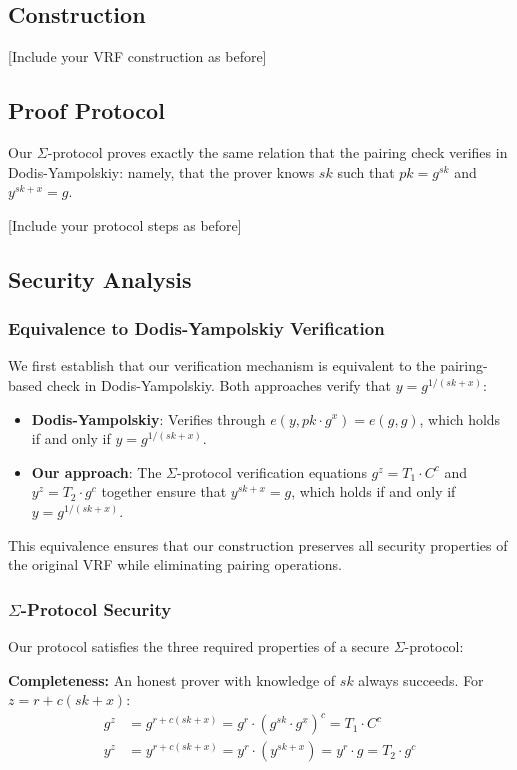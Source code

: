 \subsection{Construction}
[Include your VRF construction as before]

\subsection{Proof Protocol}
Our $\Sigma$-protocol proves exactly the same relation that the pairing check verifies in Dodis-Yampolskiy: namely, that the prover knows $sk$ such that $pk = g^{sk}$ and $y^{sk+x} = g$.

[Include your protocol steps as before]

\subsection{Security Analysis}

\subsubsection{Equivalence to Dodis-Yampolskiy Verification}
We first establish that our verification mechanism is equivalent to the pairing-based check in Dodis-Yampolskiy. Both approaches verify that $y = g^{1/(sk+x)}$:

\begin{itemize}
    \item \textbf{Dodis-Yampolskiy}: Verifies through $e(y, pk \cdot g^x) = e(g, g)$, which holds if and only if $y = g^{1/(sk+x)}$.
    
    \item \textbf{Our approach}: The $\Sigma$-protocol verification equations $g^z = T_1 \cdot C^c$ and $y^z = T_2 \cdot g^c$ together ensure that $y^{sk+x} = g$, which holds if and only if $y = g^{1/(sk+x)}$.
\end{itemize}

This equivalence ensures that our construction preserves all security properties of the original VRF while eliminating pairing operations.

\subsubsection{$\Sigma$-Protocol Security}
Our protocol satisfies the three required properties of a secure $\Sigma$-protocol:

\textbf{Completeness:} An honest prover with knowledge of $sk$ always succeeds. For $z = r + c(sk+x)$:
\begin{align}
g^z &= g^{r + c(sk+x)} = g^r \cdot (g^{sk} \cdot g^x)^c = T_1 \cdot C^c\\
y^z &= y^{r + c(sk+x)} = y^r \cdot (y^{sk+x}) = y^r \cdot g = T_2 \cdot g^c
\end{align}

